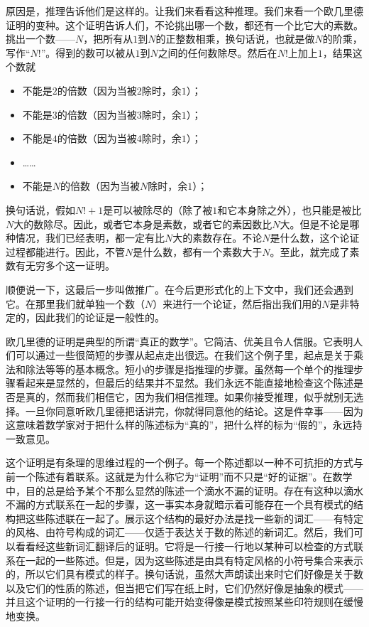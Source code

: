 原因是，推理告诉他们是这样的。让我们来看看这种推理。我们来看一个欧几里德证明的变种。这个证明告诉人们，不论挑出哪一个数，都还有一个比它大的素数。挑出一个数——$N$，把所有从$1$到$N$的正整数相乘，换句话说，也就是做$N$的阶乘，写作“$N!$”。得到的数可以被从$1$到$N$之间的任何数除尽。然后在$N!$上加上$1$，结果这个数就
\begin{itemize}
\item 不能是$2$的倍数（因为当被$2$除时，余$1$）；
\item 不能是$3$的倍数（因为当被$3$除时，余$1$）；
\item 不能是$4$的倍数（因为当被$4$除时，余$1$）；
\item ……
\item 不能是$N$的倍数（因为当被$N$除时，余$1$）；
\end{itemize}
换句话说，假如$N!+1$是可以被除尽的（除了被$1$和它本身除之外），也只能是被比$N$大的数除尽。因此，或者它本身是素数，或者它的素因数比$N$大。但是不论是哪种情况，我们已经表明，都一定有比$N$大的素数存在。不论$N$是什么数，这个论证过程都能进行。因此，不管$N$是什么数，都有一个素数大于$N$。至此，就完成了素数有无穷多个这一证明。

顺便说一下，这最后一步叫做推广。在今后更形式化的上下文中，我们还会遇到它。在那里我们就单独一个数（$N$）来进行一个论证，然后指出我们用的$N$是非特定的，因此我们的论证是一般性的。

欧几里德的证明是典型的所谓“真正的数学”。它简洁、优美且令人信服。它表明人们可以通过一些很简短的步骤从起点走出很远。在我们这个例子里，起点是关于乘法和除法等等的基本概念。短小的步骤是指推理的步骤。虽然每一个单个的推理步骤看起来是显然的，但最后的结果并不显然。我们永远不能直接地检查这个陈述是否是真的，然而我们相信它，因为我们相信推理。如果你接受推理，似乎就别无选择。一旦你同意听欧几里德把话讲完，你就得同意他的结论。这是件幸事——因为这意味着数学家对于把什么样的陈述标为“真的”，把什么样的标为“假的”，永远持一致意见。

这个证明是有条理的思维过程的一个例子。每一个陈述都以一种不可抗拒的方式与前一个陈述有着联系。这就是为什么称它为“证明”而不只是“好的证据”。在数学中，目的总是给予某个不那么显然的陈述一个滴水不漏的证明。存在有这种以滴水不漏的方式联系在一起的步骤，这一事实本身就暗示着可能存在一个具有模式的结构把这些陈述联在一起了。展示这个结构的最好办法是找一些新的词汇——有特定的风格、由符号构成的词汇——仅适于表达关于数的陈述的新词汇。然后，我们可以看看经这些新词汇翻译后的证明。它将是一行接一行地以某种可以检查的方式联系在一起的一些陈述。但是，因为这些陈述是由具有特定风格的小符号集合来表示的，所以它们具有模式的样子。换句话说，虽然大声朗读出来时它们好像是关于数以及它们的性质的陈述，但当把它们写在纸上时，它们仍然好像是抽象的模式——并且这个证明的一行接一行的结构可能开始变得像是模式按照某些印符规则在缓慢地变换。


